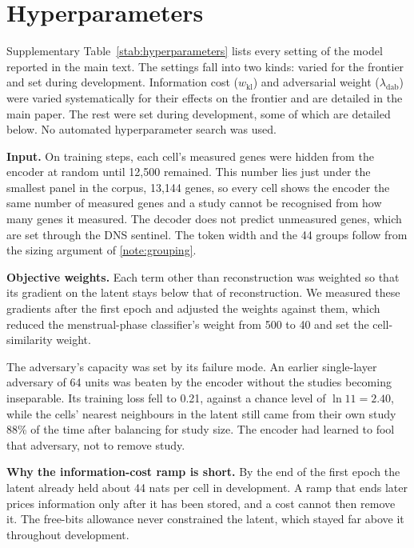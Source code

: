 
\section{Hyperparameters}
\label{note:hyperparameters}

Supplementary Table~\ref{stab:hyperparameters} lists every setting of the
model reported in the main text. The settings fall into two kinds:
varied for the frontier and set during development.
Information cost ($w_{\mathrm{kl}}$) and adversarial weight ($\lambda_{\mathrm{dab}}$) were varied
systematically for their effects on the frontier and are detailed in 
the main paper. The rest were set during development, some of which are 
detailed below. No automated hyperparameter search was used.

\textbf{Input.} On training steps, each cell's
measured genes were hidden from the encoder at random until 12{,}500
remained. This number lies just under the smallest panel in the corpus,
13{,}144 genes, so every cell shows the encoder the same number of
measured genes and a study cannot be recognised from how many genes it
measured. The decoder does not predict unmeasured genes, which are set
through the DNS sentinel. The 
token width and the 44 groups follow from the sizing argument of \ref{note:grouping}.

\textbf{Objective weights.} Each term other than reconstruction was
weighted so that its gradient on the latent stays below that of
reconstruction. We measured these gradients after the first epoch and
adjusted the weights against them, which reduced the menstrual-phase
classifier's weight from 500 to 40 and set the cell-similarity weight.

The adversary's capacity was set by its failure mode. An earlier
single-layer adversary of 64 units was beaten by the encoder without the
studies becoming inseparable. Its training loss fell to 0.21, against a
chance level of $\ln 11 = 2.40$, while the cells' nearest neighbours in the
latent still came from their own study 88\% of the time after balancing
for study size. The encoder had learned to fool that adversary, not to
remove study.

\textbf{Why the information-cost ramp is short.} By the end of the first
epoch the latent already held about 44 nats per cell in development. A ramp
that ends later prices information only after it has been stored, and a
cost cannot then remove it. The free-bits allowance never constrained the
latent, which stayed far above it throughout development.

